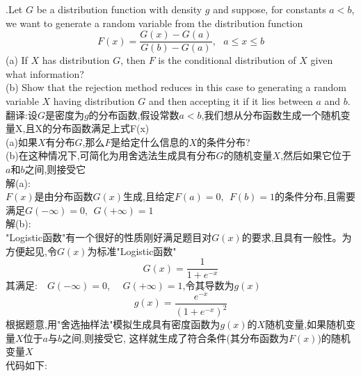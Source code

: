 \documentclass{book}
\begin{document}
.Let $G$ be a distribution function with density $g$ and suppose, for constants $a < b$,
we want to generate a random variable from the distribution function
$$
  F(x) = \frac{G(x)-G(a)}{G(b)-G(a)}, \ \ \ a \leq x \leq b
$$
(a) If $X$ has distribution $G$, then $F$ is the conditional distribution of $X$ given what information? \\
(b) Show that the rejection method reduces in this case to generating a random variable $X$ having
distribution $G$ and then accepting it if it lies between $a$ and $b$. \\
翻译:设$G$是密度为$g$的分布函数,假设常数$a < b$,我们想从分布函数生成一个随机变量X,且X的分布函数满足上式F(x) \\
(a)如果$X$有分布$G$,那么$F$是给定什么信息的$X$的条件分布? \\
(b)在这种情况下,可简化为用舍选法生成具有分布$G$的随机变量$X$,然后如果它位于$a$和$b$之间,则接受它 \\
解(a):  \\
$F(x)$是由分布函数$G(x)$生成,且给定$F(a)=0,\ \ F(b)=1$的条件分布,且需要满足$G(-\infty)=0, \ \ G(+\infty)=1$ \\
解(b):  \\
"Logistic函数"有一个很好的性质刚好满足题目对$G(x)$的要求,且具有一般性。为方便起见,令$G(x)$为标准"Logistic函数"
$$
  G(x) = \frac{1}{1+e^{-x}}
$$
其满足:\ \ $G(-\infty) = 0$, \ \ $G(+\infty) = 1$,令其导数为$g(x)$
$$
  g(x) = \frac{e^{-x}}{(1+e^{-x})^{2}}
$$
根据题意,用"舍选抽样法"模拟生成具有密度函数为$g(x)$的$X$随机变量,如果随机变量$X$位于$a$与$b$之间,则接受它,
这样就生成了符合条件(其分布函数为$F(x)$)的随机变量$X$  \\
代码如下:
\lstset{language = R}
\end{document}
